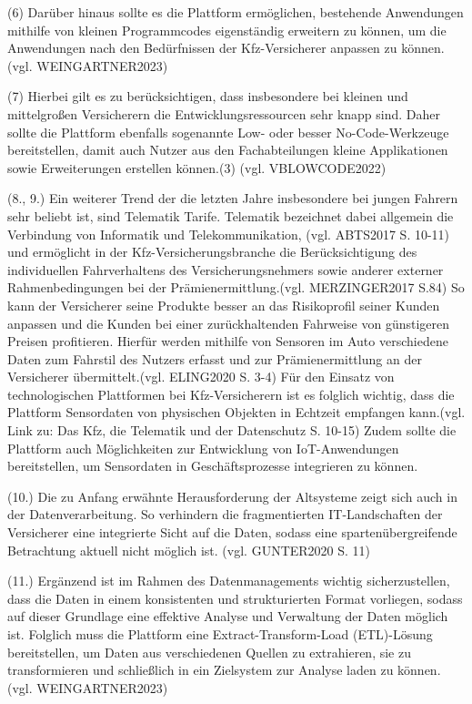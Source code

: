 (6) Darüber hinaus sollte es die Plattform ermöglichen, bestehende Anwendungen mithilfe von kleinen Programmcodes eigenständig erweitern zu können, um die Anwendungen nach den Bedürfnissen der Kfz-Versicherer anpassen zu können. (vgl. WEINGARTNER2023)

(7) Hierbei gilt es zu berücksichtigen, dass insbesondere bei kleinen und mittelgroßen Versicherern die Entwicklungsressourcen sehr knapp sind. Daher sollte die Plattform ebenfalls sogenannte Low- oder besser No-Code-Werkzeuge bereitstellen, damit auch Nutzer aus den Fachabteilungen kleine Applikationen sowie Erweiterungen erstellen können.(3) (vgl. VBLOWCODE2022)

(8., 9.) Ein weiterer Trend der die letzten Jahre insbesondere bei jungen Fahrern sehr beliebt ist, sind Telematik Tarife. Telematik bezeichnet dabei allgemein die Verbindung von Informatik und Telekommunikation, (vgl. ABTS2017 S. 10-11) und ermöglicht in der Kfz-Versicherungsbranche die Berücksichtigung des individuellen Fahrverhaltens des Versicherungsnehmers sowie anderer externer Rahmenbedingungen bei der Prämienermittlung.(vgl. MERZINGER2017 S.84) So kann der Versicherer seine Produkte besser an das Risikoprofil seiner Kunden anpassen und die Kunden bei einer zurückhaltenden Fahrweise von günstigeren Preisen profitieren. Hierfür werden mithilfe von Sensoren im Auto verschiedene Daten zum Fahrstil des Nutzers erfasst und zur Prämienermittlung an der Versicherer übermittelt.(vgl. ELING2020 S. 3-4) Für den Einsatz von technologischen Plattformen bei Kfz-Versicherern ist es folglich wichtig, dass die Plattform Sensordaten von physischen Objekten in Echtzeit empfangen kann.(vgl. Link zu: Das Kfz, die Telematik und der Datenschutz S. 10-15) Zudem sollte die Plattform auch Möglichkeiten zur Entwicklung von IoT-Anwendungen bereitstellen, um Sensordaten in Geschäftsprozesse integrieren zu können. 

(10.) Die zu Anfang erwähnte Herausforderung der Altsysteme zeigt sich auch in der Datenverarbeitung. So verhindern die fragmentierten IT-Landschaften der Versicherer eine integrierte Sicht auf die Daten, sodass eine spartenübergreifende Betrachtung aktuell nicht möglich ist. (vgl. GUNTER2020 S. 11)

(11.) Ergänzend ist im Rahmen des Datenmanagements wichtig sicherzustellen, dass die Daten in einem konsistenten und strukturierten Format vorliegen, sodass auf dieser Grundlage eine effektive Analyse und Verwaltung der Daten möglich ist. Folglich muss die Plattform eine Extract-Transform-Load (ETL)-Lösung bereitstellen, um Daten aus verschiedenen Quellen zu extrahieren, sie zu transformieren und schließlich in ein Zielsystem zur Analyse laden zu können. (vgl. WEINGARTNER2023)

